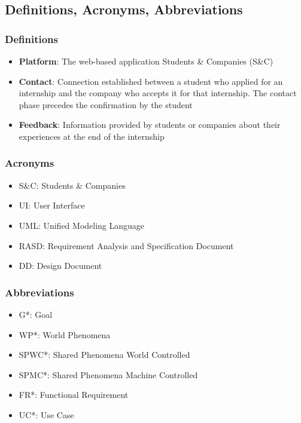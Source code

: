 
\subsection{Definitions, Acronyms, Abbreviations}

    \subsubsection{Definitions}
        \begin{itemize}
            \item \textbf{Platform}: 
            The web-based application Students \& Companies (S\&C)
            \item \textbf{Contact}: 
            Connection established between a student who applied for an internship and the company who accepts it for that internship. The contact phase precedes the confirmation by the student
            \item \textbf{Feedback}: 
            Information provided by students or companies about their experiences at the end of the internship

        \end{itemize}

    
    \subsubsection{Acronyms}
        \begin{itemize}
            \item {S\&C: Students \& Companies}
            \item {UI: User Interface}
            \item {UML: Unified Modeling Language}
            \item {RASD: Requirement Analysis and Specification Document}
            \item {DD: Design Document}
        \end{itemize}
    

    \subsubsection{Abbreviations}
        \begin{itemize}
            \item {G*: Goal}
            \item {WP*: World Phenomena}
            \item {SPWC*: Shared Phenomena World Controlled}
            \item {SPMC*: Shared Phenomena Machine Controlled}
            \item {FR*: Functional Requirement}
            \item {UC*: Use Case}
        \end{itemize}

